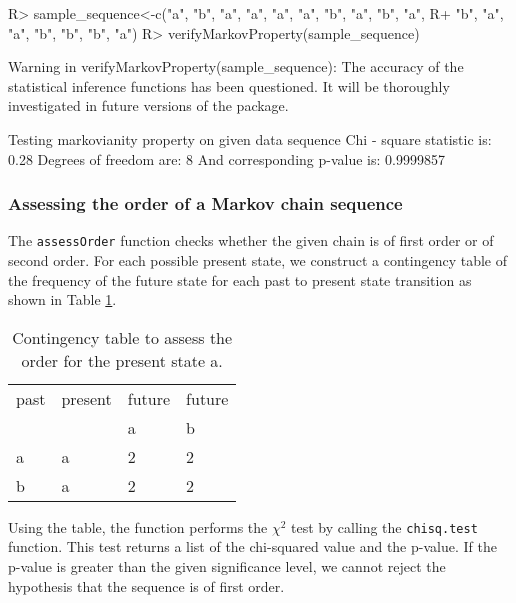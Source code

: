 \documentclass[
  nojss]{jss}
\begin{document}
\begin{CodeChunk}

\begin{CodeInput}
R> sample_sequence<-c("a", "b", "a", "a", "a", "a", "b", "a", "b", "a", 
R+                    "b", "a", "a", "b", "b", "b", "a")
R> verifyMarkovProperty(sample_sequence)
\end{CodeInput}

\begin{CodeOutput}
Warning in verifyMarkovProperty(sample_sequence): The accuracy of the
statistical inference functions has been questioned. It will be thoroughly
investigated in future versions of the package.
\end{CodeOutput}

\begin{CodeOutput}
Testing markovianity property on given data sequence
Chi - square statistic is: 0.28 
Degrees of freedom are: 8 
And corresponding p-value is: 0.9999857 
\end{CodeOutput}
\end{CodeChunk}

\hypertarget{assessing-the-order-of-a-markov-chain-sequence}{%
\subsubsection{Assessing the order of a Markov chain sequence}\label{assessing-the-order-of-a-markov-chain-sequence}}

The \texttt{assessOrder} function checks whether the given chain is of first order or of second order. For each possible present state, we construct a contingency table of the frequency of the future state for each past to present state transition as shown in Table \ref{tab:order}.

\begin{table}[h]
  \centering
  \begin{tabular}{l | l | l | l}
    \hline
  past & present & future & future \\
   &  & a & b \\
    \hline  \hline
  a & a & 2 & 2\\
  b & a & 2 & 2\\
  \hline
\end{tabular}
\caption{Contingency table to assess the order for the present state a.}
\label{tab:order}
\end{table}

Using the table, the function performs the \(\chi ^2\) test by calling the \texttt{chisq.test} function.
This test returns a list of the chi-squared value and the p-value. If the p-value is greater than the given significance level, we cannot reject the hypothesis that the sequence is of first order.
\end{document}
